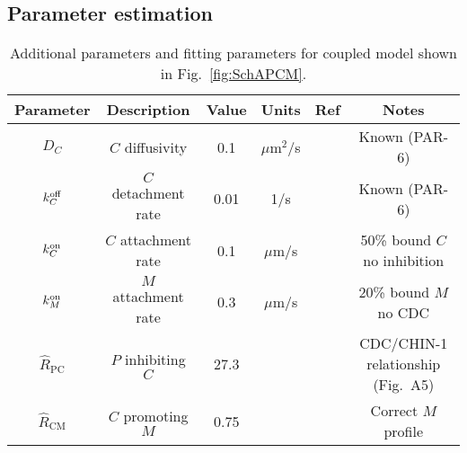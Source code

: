 \documentclass[11pt]{article}
\newcommand{\6}[1]{#1_{\text{6}}}
\newcommand{\3}[1]{#1_{\text{3}}}
\newcommand{\C}[1]{#1_C}
\begin{document}
\subsection{Parameter estimation}
\begin{table}
\begin{small}
\centering
\begin{tabular}{|c|c|c|c|c|c|}\hline
Parameter & Description & Value & Units & Ref & Notes \\ \hline
$\C{D}$ & $C$ diffusivity & 0.1 & $\mu$m$^2$/s & \cite{robin2014single} & Known (PAR-6)\\
$\C{\koff} $ & $C$ detachment rate & 0.01 & 1/s & \cite{robin2014single}& Known (PAR-6)\\ 
$k^\text{on}_C$ & $C$ attachment rate & 0.1 & $\mu$m/s & & 50\% bound $C$ no inhibition \\ 
$k^\text{on}_M$ & $M$ attachment rate & 0.3 & $\mu$m/s & & 20\% bound $M$ no CDC \\
$\hat R_\text{PC}$ & $P$ inhibiting $C$ & 27.3  & & \cite{sailer2015dynamic} & CDC/CHIN-1 relationship (Fig.\ A5)\\ 
$\hat R_\text{CM}$ & $C$ promoting $M$ & 0.75 & &  & Correct $M$ profile\\ \hline
\end{tabular}
\caption{\label{tab:paramsC} Additional parameters and fitting parameters for coupled model shown in Fig.\ \ref{fig:SchAPCM}.}
\end{small}
\end{table}
\end{document}

